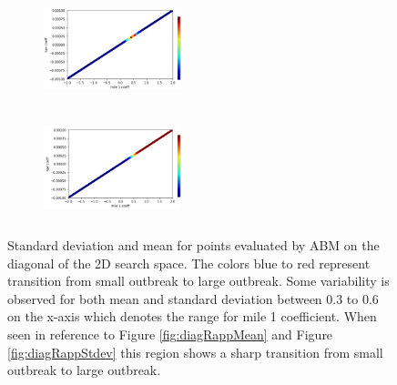 \begin{figure}
\begin{subfigure}{.25\textwidth}
  \includegraphics[height=3cm,width=4cm]{AAMAS20Template-submission/figures/rapp100diagstdev1.png}
\end{subfigure}%
\begin{subfigure}{.25\textwidth}
  \includegraphics[height=3cm,width=4cm]{AAMAS20Template-submission/figures/rapp100diagmean1.png}
\end{subfigure}
\caption{Standard deviation and mean for points evaluated by ABM on the diagonal of the 2D search space. The colors blue to red represent transition from small outbreak to large outbreak. Some variability is observed for both mean and standard deviation between 0.3 to 0.6 on the x-axis which denotes the range for mile 1 coefficient. When seen in reference to Figure \ref{fig:diagRappMean} and Figure \ref{fig:diagRappStdev} this region shows a sharp transition from small outbreak to large outbreak.}
\label{fig:diagDisplay}
\end{figure}

